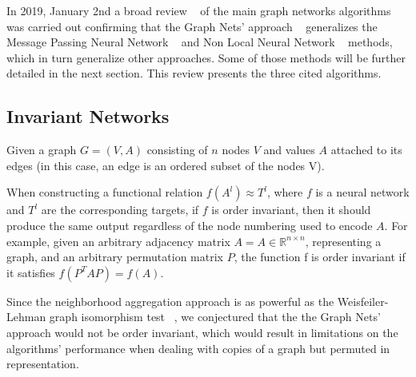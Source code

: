 In 2019, January 2nd a broad review ~\cite{Zhou_2019} of the main graph networks algorithms was carried out confirming that the Graph Nets’ approach ~\cite{Battaglia_2018} generalizes the Message Passing Neural Network ~\cite{Gilmer_2017} and Non Local Neural Network ~\cite{Wang_2018} methods, which in turn generalize other approaches. Some of those methods will be further detailed in the next section. This review presents the three cited algorithms. 


\subsection{Invariant Networks}

Given a graph $G = (V, A)$ consisting of $n$ nodes $V$ and values $A$ attached to its edges (in this case, an edge is an ordered subset of the nodes V).

When constructing a functional relation $f(A^l) \approx T^l$, where $f$ is a neural network and $T^l$ are the corresponding targets, if $f$ is order invariant, then it should produce the same output regardless of the node numbering used to encode $A$. For example, given an arbitrary adjacency matrix $A = A \in \mathds{R}^{n \times n}$, representing a graph, and an arbitrary permutation matrix $P$, the function f is order invariant if it satisfies $f(P^T A P) = f(A)$.

Since the neighborhood aggregation approach is as powerful as the Weisfeiler-Lehman graph isomorphism test ~\cite{Xu_2018}, we conjectured that the the Graph Nets’ approach would not be order invariant, which would result in limitations on the algorithms’ performance when dealing with copies of a graph but permuted in representation. 